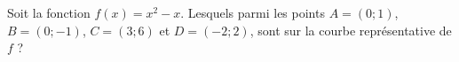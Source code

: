 
\begin{exercice}\label{exoSeconde-0049}

    Soit la fonction \( f(x)=x^2-x\). Lesquels parmi les points \( A=(0;1)\), \( B=(0;-1)\), \( C=(3;6)\) et \( D=(-2;2)\), sont sur la courbe représentative de \( f\) ?

\end{exercice}
